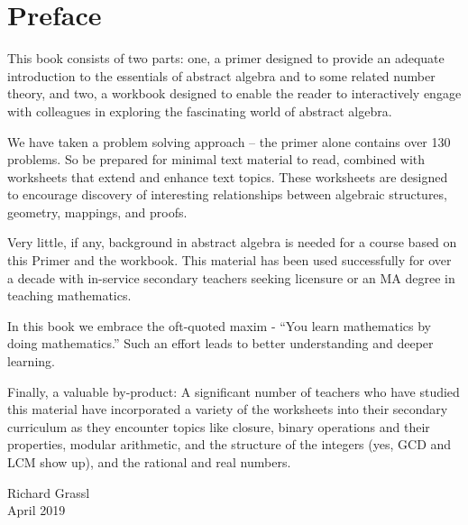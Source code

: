 
\section*{Preface}

This book consists of two parts: one, a primer designed to provide an adequate introduction to the essentials of abstract algebra and to some related number theory, and two, a workbook designed to enable the reader to interactively engage with colleagues in exploring the fascinating world of abstract algebra.

We have taken a problem solving approach -- the primer alone contains over 130 problems. So be prepared for minimal text material to read, combined with worksheets that extend and enhance text topics. These worksheets are designed to encourage discovery of interesting relationships between algebraic structures, geometry, mappings, and proofs.

Very little, if any, background in abstract algebra is needed for a course based on this Primer and the workbook. This material has been used successfully for over a decade with in-service secondary teachers seeking licensure or an MA degree in teaching mathematics.

In this book we embrace the oft-quoted maxim - ``You learn mathematics by doing mathematics.'' Such an effort leads to better understanding and deeper learning.

Finally, a valuable by-product: A significant number of teachers who have studied this material have incorporated a variety of the worksheets into their secondary curriculum as they encounter topics like closure, binary operations and their properties, modular arithmetic, and the structure of the integers (yes, GCD and LCM show up), and the rational and real numbers.


\begin{flushright}
  Richard Grassl\\
  April 2019
\end{flushright}


\cleardoublepage
